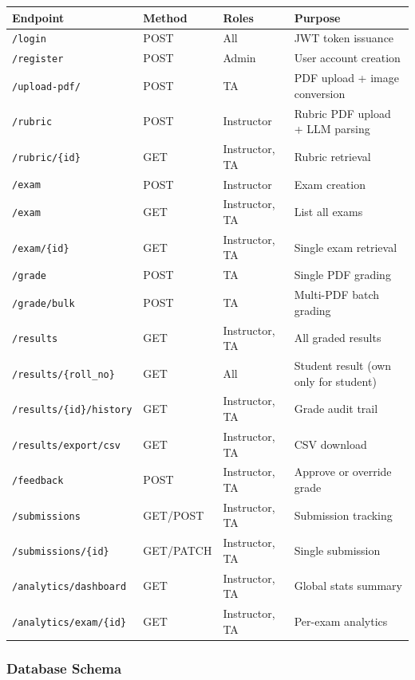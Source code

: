 \documentclass[12pt,a4paper]{article}
\begin{document}
\begin{center}
\footnotesize
\begin{tabular}{llll}
\toprule
\textbf{Endpoint} & \textbf{Method} & \textbf{Roles} & \textbf{Purpose} \\
\midrule
\texttt{/login} & POST & All & JWT token issuance \\
\texttt{/register} & POST & Admin & User account creation \\
\texttt{/upload-pdf/} & POST & TA & PDF upload + image conversion \\
\texttt{/rubric} & POST & Instructor & Rubric PDF upload + LLM parsing \\
\texttt{/rubric/\{id\}} & GET & Instructor, TA & Rubric retrieval \\
\texttt{/exam} & POST & Instructor & Exam creation \\
\texttt{/exam} & GET & Instructor, TA & List all exams \\
\texttt{/exam/\{id\}} & GET & Instructor, TA & Single exam retrieval \\
\texttt{/grade} & POST & TA & Single PDF grading \\
\texttt{/grade/bulk} & POST & TA & Multi-PDF batch grading \\
\texttt{/results} & GET & Instructor, TA & All graded results \\
\texttt{/results/\{roll\_no\}} & GET & All & Student result (own only for student) \\
\texttt{/results/\{id\}/history} & GET & Instructor, TA & Grade audit trail \\
\texttt{/results/export/csv} & GET & Instructor, TA & CSV download \\
\texttt{/feedback} & POST & Instructor, TA & Approve or override grade \\
\texttt{/submissions} & GET/POST & Instructor, TA & Submission tracking \\
\texttt{/submissions/\{id\}} & GET/PATCH & Instructor, TA & Single submission \\
\texttt{/analytics/dashboard} & GET & Instructor, TA & Global stats summary \\
\texttt{/analytics/exam/\{id\}} & GET & Instructor, TA & Per-exam analytics \\
\bottomrule
\end{tabular}
\end{center}

\subsubsection{Database Schema}
\end{document}

